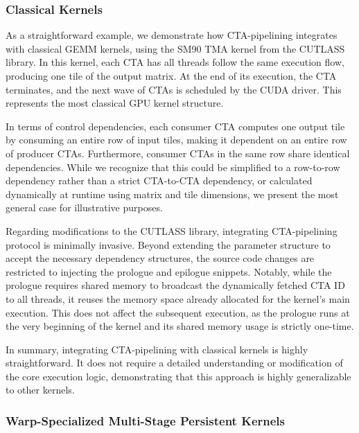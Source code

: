 \subsubsection{Classical Kernels}

As a straightforward example, we demonstrate how CTA-pipelining integrates with classical GEMM kernels, using the SM90 TMA kernel from the CUTLASS library. In this kernel, each CTA has all threads follow the same execution flow, producing one tile of the output matrix. At the end of its execution, the CTA terminates, and the next wave of CTAs is scheduled by the CUDA driver. This represents the most classical GPU kernel structure.


In terms of control dependencies, each consumer CTA computes one output tile by consuming an entire row of input tiles, making it dependent on an entire row of producer CTAs. Furthermore, consumer CTAs in the same row share identical dependencies. While we recognize that this could be simplified to a row-to-row dependency rather than a strict CTA-to-CTA dependency, or calculated dynamically at runtime using matrix and tile dimensions, we present the most general case for illustrative purposes.

Regarding modifications to the CUTLASS library, integrating CTA-pipelining protocol is minimally invasive. Beyond extending the parameter structure to accept the necessary dependency structures, the source code changes are restricted to injecting the prologue and epilogue snippets. Notably, while the prologue requires shared memory to broadcast the dynamically fetched CTA ID to all threads, it reuses the memory space already allocated for the kernel's main execution. This does not affect the subsequent execution, as the prologue runs at the very beginning of the kernel and its shared memory usage is strictly one-time.

In summary, integrating CTA-pipelining with classical kernels is highly straightforward. It does not require a detailed understanding or modification of the core execution logic, demonstrating that this approach is highly generalizable to other kernels.

\subsubsection{Warp-Specialized Multi-Stage Persistent Kernels}

